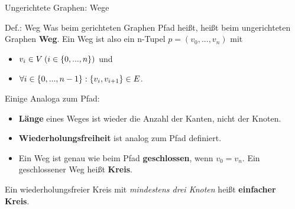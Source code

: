 \begin{frame}{Ungerichtete Graphen: Wege}
	\begin{block}{Def.: Weg}
		Was beim gerichteten Graphen Pfad heißt, heißt beim ungerichteten Graphen \textbf{Weg}. Ein Weg ist also ein n-Tupel $p=(v_0,...,v_n)$ mit
		\begin{itemize}
		 	\item $v_i\in V \: (i\in\left\{ 0,...,n \right\})$ und
		 	\item $\forall i \in \left\{ 0,...,n-1 \right\}: \left\{ v_i,v_{i+1} \right\} \in E$.
		\end{itemize}
		\medskip
		\pause
		Einige Analoga zum Pfad:
		\begin{itemize}
			\item \textbf{Länge} eines Weges ist wieder die Anzahl der Kanten, nicht der Knoten.\\
			\item \textbf{Wiederholungsfreiheit} ist analog zum Pfad definiert.
			\item Ein Weg ist genau wie beim Pfad \textbf{geschlossen}, wenn $v_0 = v_n$. Ein geschlossener Weg heißt \textbf{Kreis}.
		\end{itemize}
		Ein wiederholungsfreier Kreis mit \textit{mindestens drei Knoten} heißt \textbf{einfacher Kreis}.
	\end{block}
\end{frame}


